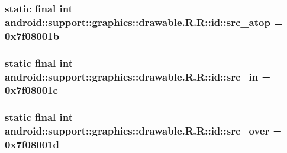 \hypertarget{classandroid_1_1support_1_1graphics_1_1drawable_1_1_r_1_1id_6e2a80c52f8071a878f8de01225e4569}{
\subsubsection[{src\_\-atop}]{\setlength{\rightskip}{0pt plus 5cm}static final int android::support::graphics::drawable.R.R::id::src\_\-atop = 0x7f08001b}}
\label{classandroid_1_1support_1_1graphics_1_1drawable_1_1_r_1_1id_6e2a80c52f8071a878f8de01225e4569}


\hypertarget{classandroid_1_1support_1_1graphics_1_1drawable_1_1_r_1_1id_4c1bcc508371d0a65d2c2eb9238f1f4c}{
\subsubsection[{src\_\-in}]{\setlength{\rightskip}{0pt plus 5cm}static final int android::support::graphics::drawable.R.R::id::src\_\-in = 0x7f08001c}}
\label{classandroid_1_1support_1_1graphics_1_1drawable_1_1_r_1_1id_4c1bcc508371d0a65d2c2eb9238f1f4c}


\hypertarget{classandroid_1_1support_1_1graphics_1_1drawable_1_1_r_1_1id_494a1c9b6f6802858a769f6c7822fc73}{
\subsubsection[{src\_\-over}]{\setlength{\rightskip}{0pt plus 5cm}static final int android::support::graphics::drawable.R.R::id::src\_\-over = 0x7f08001d}}
\label{classandroid_1_1support_1_1graphics_1_1drawable_1_1_r_1_1id_494a1c9b6f6802858a769f6c7822fc73}


